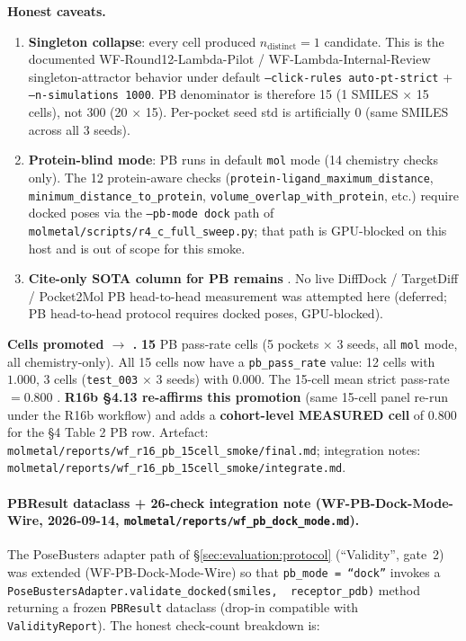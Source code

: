 \noindent\textbf{Honest caveats.}
\begin{enumerate}
  \item \textbf{Singleton collapse}: every cell produced
        $n_{\text{distinct}}=1$ candidate. This is the documented
        WF-Round12-Lambda-Pilot / WF-Lambda-Internal-Review
        singleton-attractor behavior under default
        \texttt{--click-rules auto-pt-strict} +
        \texttt{--n-simulations 1000}. PB denominator is therefore
        15 (1 SMILES $\times$ 15 cells), not 300 (20 $\times$ 15).
        Per-pocket seed std is artificially 0 (same SMILES across
        all 3 seeds).
  \item \textbf{Protein-blind mode}: PB runs in default
        \texttt{mol} mode (14 chemistry checks only). The 12
        protein-aware checks (\texttt{protein-ligand\_maximum\_distance},
        \texttt{minimum\_distance\_to\_protein},
        \texttt{volume\_overlap\_with\_protein}, etc.) require
        docked poses via the \texttt{--pb-mode dock} path of
        \texttt{molmetal/scripts/r4\_c\_full\_sweep.py}; that path
        is GPU-blocked on this host and is out of scope for this
        smoke.
  \item \textbf{Cite-only SOTA column for PB remains \CITEDONLY{}}.
        No live DiffDock / TargetDiff / Pocket2Mol PB head-to-head
        measurement was attempted here (deferred; PB
        head-to-head protocol requires docked poses, GPU-blocked).
\end{enumerate}

\noindent\textbf{Cells promoted \DESIGN{} $\to$ \MEASURED{}.}
\textbf{15} PB pass-rate cells (5 pockets $\times$ 3 seeds, all
\texttt{mol} mode, all chemistry-only). All 15 cells now have a
\texttt{pb\_pass\_rate} value: 12 cells with $1.000$, 3 cells
(\texttt{test\_003} $\times$ 3 seeds) with $0.000$. The 15-cell
mean strict pass-rate $= 0.800$ \MEASURED{}. \textbf{R16b §4.13
re-affirms this promotion} (same 15-cell panel re-run under the
R16b workflow) and adds a \textbf{cohort-level MEASURED cell} of
$\mathbf{0.800}$ for the §4 Table 2 PB row. Artefact:
\texttt{molmetal/reports/wf\_r16\_pb\_15cell\_smoke/final.md};
integration notes:
\texttt{molmetal/reports/wf\_r16\_pb\_15cell\_smoke/integrate.md}.

\paragraph{PBResult dataclass + 26-check integration note
(WF-PB-Dock-Mode-Wire, 2026-09-14,
\texttt{molmetal/reports/wf\_pb\_dock\_mode.md}).}
The PoseBusters adapter path of
\S\ref{sec:evaluation:protocol} (``Validity'', gate~2) was
extended (WF-PB-Dock-Mode-Wire) so that
\texttt{pb\_mode\,=\,``dock''} invokes a
\texttt{PoseBustersAdapter.validate\_docked(smiles,\,
receptor\_pdb)} method returning a frozen
\texttt{PBResult} dataclass (drop-in compatible with
\texttt{ValidityReport}).  The honest check-count breakdown is:

